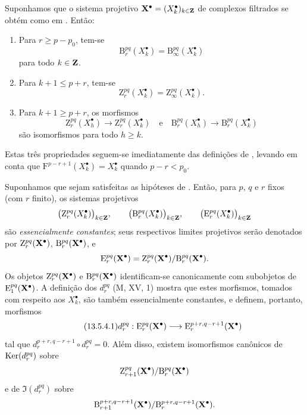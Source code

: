 \begin{lemma}[13.5.3]
\label{0.13.5.3}
Suponhamos que o sistema projetivo
$\mathbf{X}^\bullet=(X^\bullet_k)_{k\in\mathbf{Z}}$ de complexos filtrados se
obtém como em . Então:
\begin{enumerate}
  \item[{\rm a)}] Para $r\geq p-p_0$, tem-se
  \[
    \mathrm{B}_r^{pq}(X^\bullet_k)
    =
    \mathrm{B}_\infty^{pq}(X^\bullet_k)
  \]
  para todo $k\in\mathbf{Z}$.
  \item[{\rm b)}] Para $k+1\leq p+r$, tem-se
  \[
    \mathrm{Z}_r^{pq}(X^\bullet_k)
    =
    \mathrm{Z}_\infty^{pq}(X^\bullet_k).
  \]
  \item[{\rm c)}] Para $k+1\geq p+r$, os morfismos
  \[
    \mathrm{Z}_r^{pq}(X^\bullet_h)
    \longrightarrow
    \mathrm{Z}_r^{pq}(X^\bullet_k)
    \quad\text{e}\quad
    \mathrm{B}_r^{pq}(X^\bullet_h)
    \longrightarrow
    \mathrm{B}_r^{pq}(X^\bullet_k)
  \]
  são isomorfismos para todo $h\geq k$.
\end{enumerate}
\end{lemma}

Estas três propriedades seguem-se imediatamente das definições de
, levando em conta que
$\mathrm{F}^{p-r+1}(X^\bullet_k)=X^\bullet_k$ quando $p-r<p_0$.

\begin{env}[13.5.4]
\label{0.13.5.4}
Suponhamos que sejam satisfeitas as hipóteses de .
Então, para $p$, $q$ e $r$ fixos (com $r$ finito), os sistemas
projetivos
\[
  \bigl(\mathrm{Z}_r^{pq}(X^\bullet_k)\bigr)_{k\in\mathbf{Z}},
  \qquad
  \bigl(\mathrm{B}_r^{pq}(X^\bullet_k)\bigr)_{k\in\mathbf{Z}},
  \qquad
  \bigl(\mathrm{E}_r^{pq}(X^\bullet_k)\bigr)_{k\in\mathbf{Z}}
\]
são \emph{essencialmente constantes}; seus respectivos limites projetivos
serão denotados por
$\mathrm{Z}_r^{pq}(\mathbf{X}^\bullet)$,
$\mathrm{B}_r^{pq}(\mathbf{X}^\bullet)$, e
\[
  \mathrm{E}_r^{pq}(\mathbf{X}^\bullet)
  =
  \mathrm{Z}_r^{pq}(\mathbf{X}^\bullet)/
  \mathrm{B}_r^{pq}(\mathbf{X}^\bullet).
\]
Os objetos $\mathrm{Z}_r^{pq}(\mathbf{X}^\bullet)$ e
$\mathrm{B}_r^{pq}(\mathbf{X}^\bullet)$ identificam-se canonicamente com
subobjetos de $\mathrm{E}_1^{pq}(\mathbf{X}^\bullet)$.
A definição dos $d_r^{pq}$ (M, XV, 1) mostra que estes
morfismos, tomados com respeito aos $X^\bullet_k$, são também essencialmente
constantes, e definem, portanto, morfismos
\begin{equation}
\label{0.13.5.4.1}
\tag{13.5.4.1}
  d_r^{pq}:
  \mathrm{E}_r^{pq}(\bb{X}^\bullet)
  \longrightarrow
  \mathrm{E}_r^{p+r,q-r+1}(\bb{X}^\bullet)
\end{equation}
tal que
$d_r^{p+r,q-r+1}\circ d_r^{pq}=0$.
Além disso, existem isomorfismos canônicos de
$\operatorname{Ker}(d_r^{pq})$ sobre
\[
  \mathrm{Z}_{r+1}^{pq}(\mathbf{X}^\bullet)/
  \mathrm{B}_r^{pq}(\mathbf{X}^\bullet)
\]
e de $\Im(d_r^{pq})$ sobre
\[
  \mathrm{B}_{r+1}^{p+r,q-r+1}(\mathbf{X}^\bullet)/
  \mathrm{B}_r^{p+r,q-r+1}(\mathbf{X}^\bullet).
\]
\end{env}

